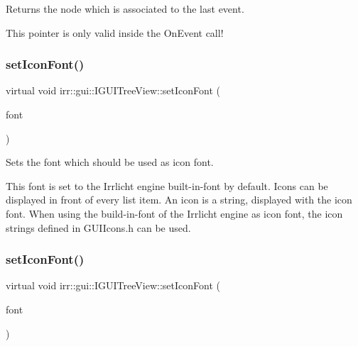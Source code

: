 Returns the node which is associated to the last event. 

This pointer is only valid inside the On\+Event call! \mbox{\label{classirr_1_1gui_1_1IGUITreeView_a07707331410d7792557c81c90ef4a09b}} 
\subsubsection{\texorpdfstring{set\+Icon\+Font()}{setIconFont()}\hspace{0.1cm}{\footnotesize\ttfamily [1/2]}}
{\footnotesize\ttfamily virtual void irr\+::gui\+::\+I\+G\+U\+I\+Tree\+View\+::set\+Icon\+Font (\begin{DoxyParamCaption}\item[{\hyperlink{classirr_1_1gui_1_1IGUIFont}{I\+G\+U\+I\+Font} $\ast$}]{font }\end{DoxyParamCaption})\hspace{0.3cm}{\ttfamily [pure virtual]}}



Sets the font which should be used as icon font. 

This font is set to the Irrlicht engine built-\/in-\/font by default. Icons can be displayed in front of every list item. An icon is a string, displayed with the icon font. When using the build-\/in-\/font of the Irrlicht engine as icon font, the icon strings defined in G\+U\+I\+Icons.\+h can be used. \mbox{\label{classirr_1_1gui_1_1IGUITreeView_a07707331410d7792557c81c90ef4a09b}} 
\subsubsection{\texorpdfstring{set\+Icon\+Font()}{setIconFont()}\hspace{0.1cm}{\footnotesize\ttfamily [2/2]}}
{\footnotesize\ttfamily virtual void irr\+::gui\+::\+I\+G\+U\+I\+Tree\+View\+::set\+Icon\+Font (\begin{DoxyParamCaption}\item[{\hyperlink{classirr_1_1gui_1_1IGUIFont}{I\+G\+U\+I\+Font} $\ast$}]{font }\end{DoxyParamCaption})\hspace{0.3cm}{\ttfamily [pure virtual]}}



